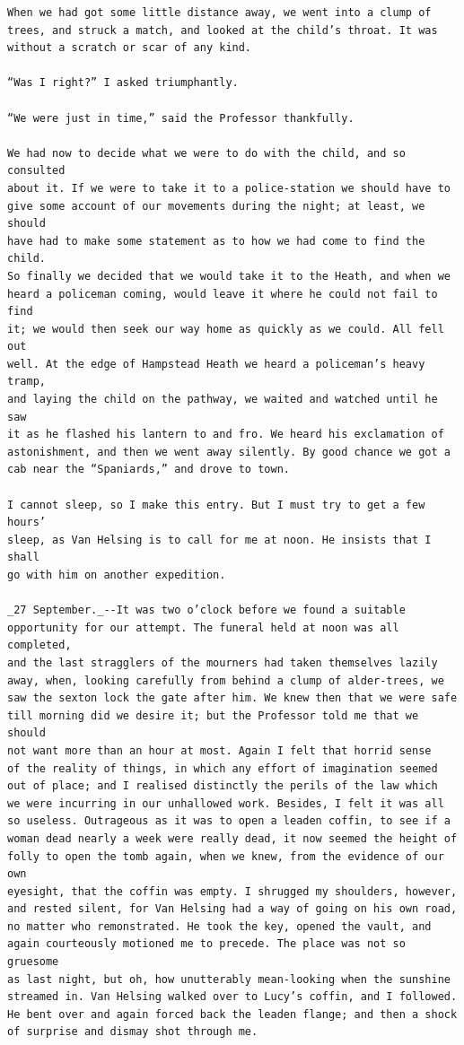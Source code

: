 \documentclass{article}
\begin{document}
\begin{verbatim}
When we had got some little distance away, we went into a clump of
trees, and struck a match, and looked at the child’s throat. It was
without a scratch or scar of any kind.

“Was I right?” I asked triumphantly.

“We were just in time,” said the Professor thankfully.

We had now to decide what we were to do with the child, and so consulted
about it. If we were to take it to a police-station we should have to
give some account of our movements during the night; at least, we should
have had to make some statement as to how we had come to find the child.
So finally we decided that we would take it to the Heath, and when we
heard a policeman coming, would leave it where he could not fail to find
it; we would then seek our way home as quickly as we could. All fell out
well. At the edge of Hampstead Heath we heard a policeman’s heavy tramp,
and laying the child on the pathway, we waited and watched until he saw
it as he flashed his lantern to and fro. We heard his exclamation of
astonishment, and then we went away silently. By good chance we got a
cab near the “Spaniards,” and drove to town.

I cannot sleep, so I make this entry. But I must try to get a few hours’
sleep, as Van Helsing is to call for me at noon. He insists that I shall
go with him on another expedition.

_27 September._--It was two o’clock before we found a suitable
opportunity for our attempt. The funeral held at noon was all completed,
and the last stragglers of the mourners had taken themselves lazily
away, when, looking carefully from behind a clump of alder-trees, we
saw the sexton lock the gate after him. We knew then that we were safe
till morning did we desire it; but the Professor told me that we should
not want more than an hour at most. Again I felt that horrid sense
of the reality of things, in which any effort of imagination seemed
out of place; and I realised distinctly the perils of the law which
we were incurring in our unhallowed work. Besides, I felt it was all
so useless. Outrageous as it was to open a leaden coffin, to see if a
woman dead nearly a week were really dead, it now seemed the height of
folly to open the tomb again, when we knew, from the evidence of our own
eyesight, that the coffin was empty. I shrugged my shoulders, however,
and rested silent, for Van Helsing had a way of going on his own road,
no matter who remonstrated. He took the key, opened the vault, and
again courteously motioned me to precede. The place was not so gruesome
as last night, but oh, how unutterably mean-looking when the sunshine
streamed in. Van Helsing walked over to Lucy’s coffin, and I followed.
He bent over and again forced back the leaden flange; and then a shock
of surprise and dismay shot through me.


\end{verbatim}
\end{document}
